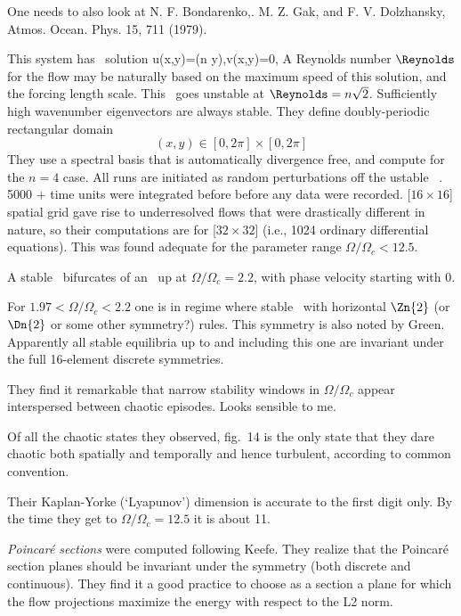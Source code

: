 \begin{description}
{One needs to also look at
N. F. Bondarenko,. M. Z. Gak, and F. V. Dolzhansky, Atmos. Ocean.
Phys. 15, 711 (1979).

This system has \eqv\ solution
\beq
u(x,y)=\sin(n y),\quad v(x,y)=0,
A Reynolds number $\Reynolds$ for the flow may be naturally based on the
maximum speed of this solution, and the forcing length scale. This \eqv\
goes unstable at $\Reynolds=n\sqrt{2}$. Sufficiently high wavenumber
eigenvectors are always stable. They define doubly-periodic rectangular
domain
\[
(x,y)\in [0,2\pi]\times [0,2\pi]
\]
They use a spectral basis that is automatically divergence free,
and compute for the $n = 4$ case.
All runs are initiated as random perturbations off the ustable \eqv\
. 5000 + time units were integrated before
before any data were recorded.
[$16 \times 16$] spatial grid gave rise to underresolved
flows that were drastically different in nature, so their computations are
for [$32 \times 32$]  (i.e., 1024 ordinary differential equations).
This was
found adequate for the parameter range
$\Omega/\Omega_c<12.5$.

A stable \reqv\ bifurcates of an \eqv\ up at $\Omega/\Omega_c = 2.2$,
with phase velocity starting with 0.

For $1.97<\Omega/\Omega_c<2.2$ one is in regime where stable \eqv\ with
horizontal $\Zn{2}$ (or $\Dn{2}$ or some other symmetry?) rules.
This symmetry is also noted by Green\rf{Green74}. Apparently all stable
equilibria up to and including this one are invariant under the full
16-element discrete symmetries.

They find it remarkable that narrow stability windows in $\Omega/\Omega_c$
appear interspersed between chaotic episodes. Looks sensible to me.

Of all the chaotic states they observed, fig.~14 is the only state that
they dare
chaotic both spatially and temporally and hence
turbulent, according to common convention.



Their Kaplan-Yorke (`Lyapunov') dimension is accurate to the first digit only.
By the time they get to $\Omega/\Omega_c=12.5$ it is about 11.

\emph{Poincar\'e sections} were computed following Keefe. They
realize that the Poincar\'e section planes should be invariant under the
symmetry (both discrete and continuous). They find it a good practice to
choose as a section a plane for which the flow projections maximize the
energy with respect to the L2 norm.

}
\end{description}
